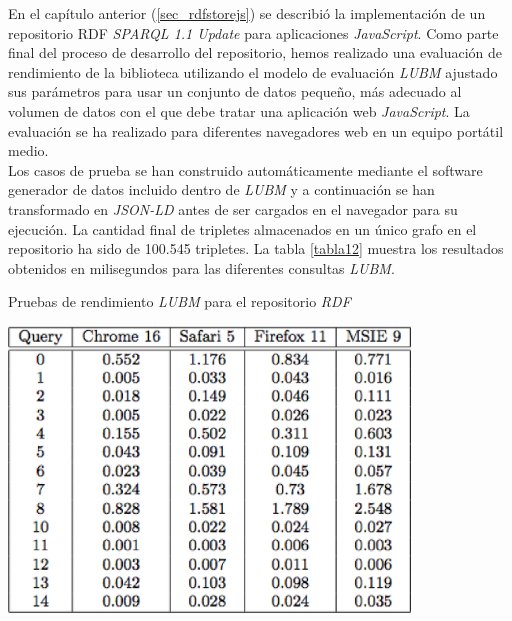 En el cap\'itulo anterior (\ref{sec_rdfstorejs}) se describi\'o la implementaci\'on de un repositorio RDF \textit{SPARQL 1.1 Update} para aplicaciones \textit{JavaScript}.
Como parte final del proceso de desarrollo del repositorio, hemos realizado una evaluaci\'on de rendimiento de la biblioteca utilizando el modelo de evaluaci\'on \textit{LUBM} \cite{lubm} ajustado sus par\'ametros para usar un conjunto de datos peque\~no, m\'as adecuado al volumen de datos con el que debe tratar una aplicaci\'on web \textit{JavaScript}. La evaluaci\'on se ha realizado para diferentes navegadores web en un equipo port\'atil medio.\\
Los casos de prueba se han construido autom\'aticamente mediante el software generador de datos incluido dentro de \textit{LUBM} y a continuaci\'on se han transformado en \textit{JSON-LD} antes de ser cargados en el navegador para su ejecuci\'on. La cantidad final de tripletes almacenados en un \'unico grafo en el repositorio ha sido de 100.545 tripletes. La tabla \ref{tabla12} muestra los resultados obtenidos en milisegundos para las diferentes consultas \textit{LUBM}.\\

\begin{table}
\vspace{2.4in}
\centering
\caption{Pruebas de rendimiento \textit{LUBM} para el repositorio \textit{RDF}}
\vspace{5mm}
\includegraphics[width=0.8\textwidth]{tabla12}
\label{tabla12}
\end{table}

